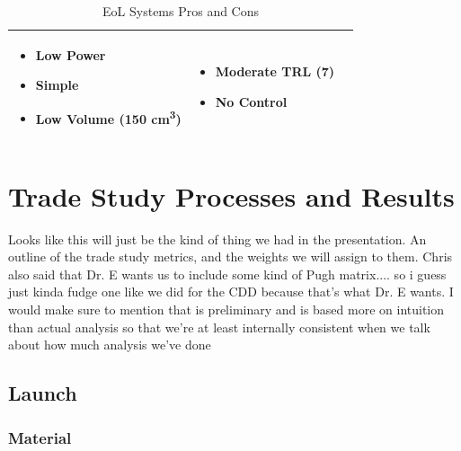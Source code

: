 \begin{table}[H]
\begin{tabular}{|p{}|p{}|p{}|}
    \begin{itemize}
        \item Low Power
        \item Simple
        \item Low Volume (150 cm\textsuperscript{3})\cite{RODEO_Presentation}
    \end{itemize}
    &
    \begin{itemize}
        \item Moderate TRL (7)
        \item No Control
    \end{itemize}
    \\
\hline
\end{tabular}
\caption{EoL Systems Pros and Cons}
\label{tbl:Eol_ProCon}
\end{table}

\section{Trade Study Processes and Results}
Looks like this will just be the kind of thing we had in the presentation. An outline of the trade study metrics, and the weights we will assign to them. Chris also said that Dr. E wants us to include some kind of Pugh matrix.... so i guess just kinda fudge one like we did for the CDD because that's what Dr. E wants. I would make sure to mention that is preliminary and is based more on intuition than actual analysis so that we're at least internally consistent when we talk about how much analysis we've done

\subsection{Launch}

\subsubsection{Material}
